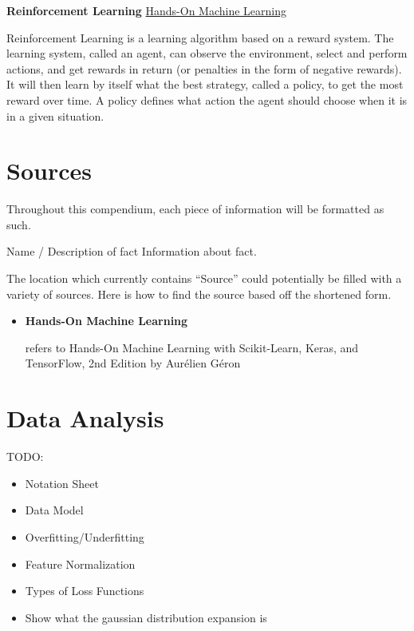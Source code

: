 \documentclass[12pt]{article}
\newcommand{\homl}{\hyperlink{homl}{Hands-On Machine Learning}}
\newenvironment{fact*}[2][]
    {
    \begin{adjustwidth}{1em}{0em}
    \noindent
    \textbf{#2} \hfill #1
    
    \vspace{0.1in}
    \noindent
    \ignorespaces
    }
    {
    \end{adjustwidth}
    }
\newenvironment{fact}[2][]
    {
    \index{#2}
    \hypertarget{#2}{\vspace{0.2in}}
    \begin{adjustwidth}{1em}{0em}
    \noindent
    \textbf{#2} \hfill #1
    
    \vspace{0.1in}
    \noindent
    \ignorespaces
    }
    {
    \end{adjustwidth}
    }
\begin{document}
    \begin{fact}[\homl]{Reinforcement Learning}
        Reinforcement Learning is a learning algorithm based on a reward system. The learning system, called an agent, can observe the environment,
        select and perform actions, and get rewards in return (or penalties in the form of negative rewards). It will then learn by itself what the 
        best strategy, called a policy, to get the most reward over time. A policy defines what action the agent should choose when it is in a given
        situation.
    \end{fact}

\newpage

\section*{Sources}
    Throughout this compendium, each piece of information will be formatted as such.
    
    \vspace{0.1in}
    \begin{fact*}[Source]{Name / Description of fact}
        Information about fact.
    \end{fact*}
    \vspace{0.3in}
    
    \noindent The location which currently contains ``Source'' could potentially be filled with a variety of sources. Here is how to find the source based off the shortened form.
    
    \begin{itemize}
        \item \hypertarget{homl}{\textbf{Hands-On Machine Learning}} refers to Hands-On Machine Learning with Scikit-Learn, Keras, and TensorFlow, 2nd Edition by Aurélien Géron
    \end{itemize}

\newpage

\section{Data Analysis}
TODO:
\begin{itemize}
    \item Notation Sheet
    \item Data Model
    \item Overfitting/Underfitting
    \item Feature Normalization
    \item Types of Loss Functions
    \item Show what the gaussian distribution expansion is
\end{itemize}
\end{document}
